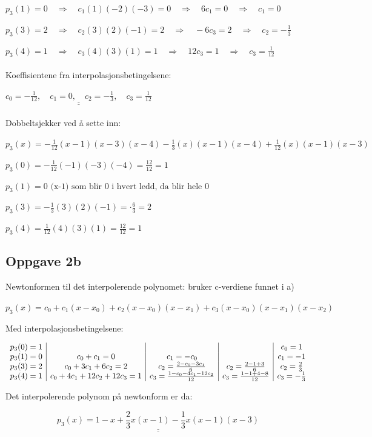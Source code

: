 \documentclass{article}
\newcommand{\uu}[1]{\underline{\underline{#1}}}
\newcommand{\req}{\quad\Longrightarrow\quad}
\begin{document}
\(p_3(1) = 0 \req c_1(1)(-2)(-3) = 0 \req 6c_1 = 0 \req c_1 = 0
\)

\(p_3(3) = 2 \req c_2(3)(2)(-1) = 2 \req -6c_3 = 2 \req c_2 = -\frac{1}{3}
\)

\(p_3(4) = 1 \req c_3(4)(3)(1) = 1 \req 12c_3 = 1 \req c_3 = \frac{1}{12}
\)\\\\

Koeffisientene fra interpolasjonsbetingelsene:

\(\uu{c_0 = -\frac{1}{12}, \quad c_1 = 0, \quad c_2 = -\frac{1}{3}, \quad c_3 = \frac{1}{12}}\)\\\\

Dobbeltsjekker ved å sette inn:

\(p_3(x) = -\frac{1}{12}(x-1)(x-3)(x-4)-\frac{1}{3}(x)(x-1)(x-4) + \frac{1}{12}(x)(x-1)(x-3)\)

\(p_3(0) = -\frac{1}{12}(-1)(-3)(-4) =\frac{12}{12} = 1\)

\(p_3(1) = 0 \text{      (x-1) som blir 0 i hvert ledd, da blir hele 0}\)

\(p_3(3) = -\frac{1}{3}(3)(2)(-1) = \cdot\frac{6}{3} = 2\)

\(p_3(4) = \frac{1}{12}(4)(3)(1) = \frac{12}{12} = 1\)

\subsection*{Oppgave 2b}
Newtonformen til det interpolerende polynomet: bruker c-verdiene funnet i a)

\(p_3(x)=c_0 + c_1(x-x_0) + c_2(x-x_0)(x-x_1) + c_3(x-x_0)(x-x_1)(x-x_2)\)

Med interpolasjonsbetingelsene:

\(
\begin{array}{c | c | c | c | c}
     p_3(0) = 1 &   & &  & c_0 = 1\\
     p_3(1) = 0 &  c_0 + c_1 = 0 & c_1 = -c_0 &  & c_1 = -1 \\
     p_3(3) = 2 & c_0 + 3c_1 + 6c_2 = 2 & c_2 = \frac{2 - c_0 - 3c_1}{6} & c_2 = \frac{2-1+3}{6} & c_2 = \frac{2}{3} \\
     p_3(4) = 1 & c_0 + 4c_1 + 12c_2 + 12c_3 = 1 & c_3 = \frac{1 - c_0 - 4c_1 -12c_2}{12} & c_3 = \frac{1-1+4-8}{12} & c_3 = -\frac{1}{3}
\end{array}
\)

Det interpolerende polynom på newtonform er da:

\[\uu{p_3(x) = 1- x + \frac{2}{3}x(x-1) - \frac{1}{3}x(x-1)(x-3)}\]
\end{document}
